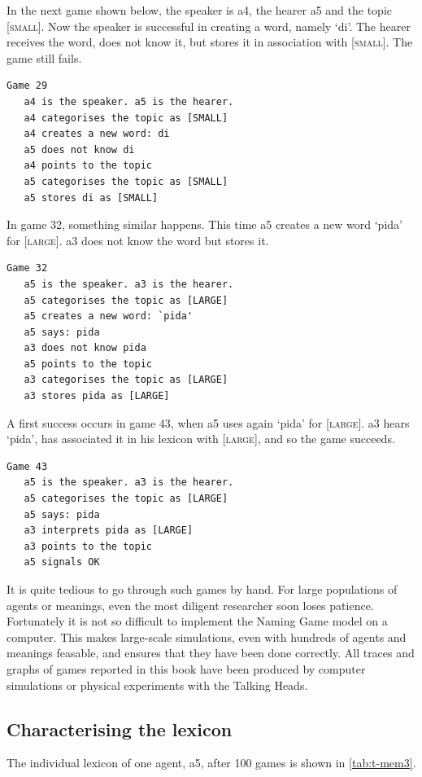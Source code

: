 In the next game shown below, the speaker is 
{\bfshape a4}, the hearer {\bfshape a5} and the topic
{}[\textsc{small}]. Now the speaker is successful in creating a word, namely 
`di'. The hearer receives the word, does not know it,
but stores it in association with [\textsc{small}]. The game still fails. 
\begin{verbatim}
Game 29
   a4 is the speaker. a5 is the hearer. 
   a4 categorises the topic as [SMALL]
   a4 creates a new word: di
   a5 does not know di
   a4 points to the topic
   a5 categorises the topic as [SMALL]
   a5 stores di as [SMALL]
\end{verbatim}
In game 32, something similar happens. This time {\bfshape a5} creates
a new word `pida' for [\textsc{large}]. {\bfshape a3} does not know 
the word but stores it. 
\begin{verbatim}
Game 32
   a5 is the speaker. a3 is the hearer. 
   a5 categorises the topic as [LARGE]
   a5 creates a new word: `pida'
   a5 says: pida
   a3 does not know pida
   a5 points to the topic
   a3 categorises the topic as [LARGE]
   a3 stores pida as [LARGE]
\end{verbatim}
A first success occurs in game 43, when {\bfshape a5} uses again 
`pida' for [\textsc{large}]. {\bfshape a3} hears `pida', has associated it 
in his lexicon with [\textsc{large}], and so the game succeeds. 
\begin{verbatim}
Game 43
   a5 is the speaker. a3 is the hearer. 
   a5 categorises the topic as [LARGE]
   a5 says: pida
   a3 interprets pida as [LARGE]
   a3 points to the topic 
   a5 signals OK
\end{verbatim}
It is quite tedious to go through such games by hand. 
For large populations of agents or meanings, even the 
most diligent researcher soon loses patience. Fortunately 
it is not so difficult to implement the Naming Game model on 
a computer. This makes large-scale simulations, even with 
hundreds of agents and meanings feasable, and ensures
that they have been done correctly.
All traces and graphs of games reported in this book
have been produced by computer simulations or physical 
experiments with the Talking Heads. 

\subsection{Characterising the lexicon}

The individual lexicon of one
agent, {\bfshape a5}, after 100 games is shown in \ref{tab:t-mem3}. 

